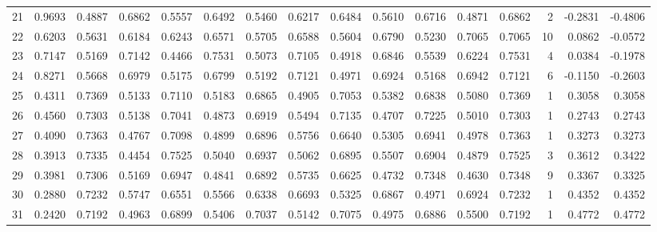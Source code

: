 \begin{tabular}{lrrrrrrrrrrrrrrr}
21  &      0.9693 &  0.4887 &  0.6862 &  0.5557 &  0.6492 &  0.5460 &  0.6217 &  0.6484 &  0.5610 &  0.6716 &   0.4871 &     0.6862 &      2 &                   -0.2831 &                    -0.4806 \\
22  &      0.6203 &  0.5631 &  0.6184 &  0.6243 &  0.6571 &  0.5705 &  0.6588 &  0.5604 &  0.6790 &  0.5230 &   0.7065 &     0.7065 &     10 &                    0.0862 &                    -0.0572 \\
23  &      0.7147 &  0.5169 &  0.7142 &  0.4466 &  0.7531 &  0.5073 &  0.7105 &  0.4918 &  0.6846 &  0.5539 &   0.6224 &     0.7531 &      4 &                    0.0384 &                    -0.1978 \\
24  &      0.8271 &  0.5668 &  0.6979 &  0.5175 &  0.6799 &  0.5192 &  0.7121 &  0.4971 &  0.6924 &  0.5168 &   0.6942 &     0.7121 &      6 &                   -0.1150 &                    -0.2603 \\
25  &      0.4311 &  0.7369 &  0.5133 &  0.7110 &  0.5183 &  0.6865 &  0.4905 &  0.7053 &  0.5382 &  0.6838 &   0.5080 &     0.7369 &      1 &                    0.3058 &                     0.3058 \\
26  &      0.4560 &  0.7303 &  0.5138 &  0.7041 &  0.4873 &  0.6919 &  0.5494 &  0.7135 &  0.4707 &  0.7225 &   0.5010 &     0.7303 &      1 &                    0.2743 &                     0.2743 \\
27  &      0.4090 &  0.7363 &  0.4767 &  0.7098 &  0.4899 &  0.6896 &  0.5756 &  0.6640 &  0.5305 &  0.6941 &   0.4978 &     0.7363 &      1 &                    0.3273 &                     0.3273 \\
28  &      0.3913 &  0.7335 &  0.4454 &  0.7525 &  0.5040 &  0.6937 &  0.5062 &  0.6895 &  0.5507 &  0.6904 &   0.4879 &     0.7525 &      3 &                    0.3612 &                     0.3422 \\
29  &      0.3981 &  0.7306 &  0.5169 &  0.6947 &  0.4841 &  0.6892 &  0.5735 &  0.6625 &  0.4732 &  0.7348 &   0.4630 &     0.7348 &      9 &                    0.3367 &                     0.3325 \\
30  &      0.2880 &  0.7232 &  0.5747 &  0.6551 &  0.5566 &  0.6338 &  0.6693 &  0.5325 &  0.6867 &  0.4971 &   0.6924 &     0.7232 &      1 &                    0.4352 &                     0.4352 \\
31  &      0.2420 &  0.7192 &  0.4963 &  0.6899 &  0.5406 &  0.7037 &  0.5142 &  0.7075 &  0.4975 &  0.6886 &   0.5500 &     0.7192 &      1 &                    0.4772 &                     0.4772 \\

\end{tabular}
